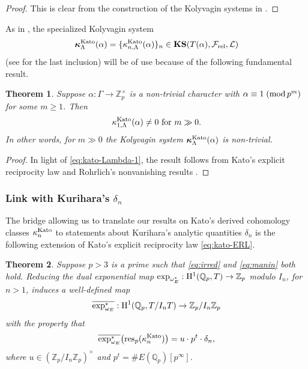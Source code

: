 \documentclass[10pt,reqno]{amsart}
\numberwithin{equation}{section}
\theoremstyle{plain}
\newtheorem{thm}{Theorem}[subsection] %
\theoremstyle{definition}
\theoremstyle{definition}
\theoremstyle{plain}
\theoremstyle{plain}
\theoremstyle{plain}
\theoremstyle{plain}
\theoremstyle{plain}
\theoremstyle{plain}
\newcommand{\Z}{\mathbb{Z}}
\newcommand{\Q}{\mathbb{Q}}
\newcommand{\Lcal}{\mathcal{L}}
\newcommand{\rH}{\mathrm{H}}
\begin{document}
\begin{proof}
This is clear from the construction of the Kolyvagin systems in \cite[App.~A]{mazrub}.
\end{proof}

As in \cite{BCGS}, the specialized Kolyvagin system 
\begin{equation}\label{eq:KS-kato-alpha}
\boldsymbol{\kappa}_\Lambda^{\rm Kato}(\alpha)=\{\kappa_{n,\Lambda}^{\rm Kato}(\alpha)\}_n\in\mathbf{KS}(T(\alpha),\mathcal{F}_{\rm rel},\Lcal)
\end{equation}
(see \cite[Cor.~5.3.15]{mazrub} for the last inclusion) will be of use because of the following fundamental result.

\begin{thm}\label{thm:nonzero-Kato-alpha}
Suppose $\alpha:\Gamma\rightarrow\Z_p^\times$ is a non-trivial character with $\alpha\equiv 1\;({\rm mod}\,p^m)$ for some $m\geq 1$. Then 
\[
\textrm{$\kappa_{1,\Lambda}^{\rm Kato}(\alpha)\neq 0$ for $m\gg 0$.}
\]
In other words, for $m\gg 0$ the Kolyvagin system $\boldsymbol{\kappa}_{\Lambda}^{\rm Kato}(\alpha)$ is non-trivial.
\end{thm}

\begin{proof}
In light of \eqref{eq:kato-Lambda-1}, the result follows from Kato's explicit reciprocity law \cite[Thm.~16.6]{kato-euler-systems} and Rohrlich's nonvanishing results \cite{rohrlich-cyc}.
\end{proof}


\subsubsection{Link with Kurihara's $\delta_n$}

The bridge allowing us to translate our results on Kato's derived cohomology classes $\kappa_n^{\rm Kato}$ to statements about Kurihara's analytic quantities  $\delta_n$ %
is the following extension of Kato's explicit reciprocity law \eqref{eq:kato-ERL}. 

\begin{thm}\label{thm:der-ERL}
Suppose $p>3$ is a prime such that \eqref{eq:irred} and \eqref{eq:manin} both hold. 
Reducing the dual exponential map
${\rm exp}_{\omega_E^*}:\rH^1(\Q_p,T)\rightarrow\Z_p$ modulo $I_n$, for $n>1$, induces a well-defined map
\[
\overline{{\rm exp}_{\omega_E}^*}:\rH^1(\Q_p,T/I_nT)\rightarrow\Z_p/I_n\Z_p
\]
with the property that 
\[
\overline{{\rm exp}_{\omega_E}^*}\bigl({\rm res}_p(\kappa_n^{\rm Kato})\bigr)=u\cdot p^t\cdot\delta_n, %
\]
where $u\in(\Z_p/I_n\Z_p)^\times$  and $p^t=\#E(\Q_p)[p^\infty]$.
\end{thm}
\end{document}
